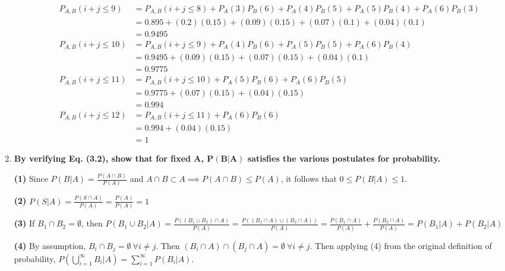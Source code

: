 \documentclass[10pt, oneside]{article}   	%
\theoremstyle{definition}
\begin{document}
\begin{enumerate}[label=3.\arabic*]
\begin{enumerate}
\begin{align*}
	P_{A,B} (i + j \leq 9) &= P_{A,B} (i + j \leq 8) + P_A (3) P_B (6) + P_A (4) P_B (5) + P_A (5) P_B (4) + P_A (6) P_B (3) \\
	&= 0.895 + (0.2)(0.15) + (0.09)(0.15) + (0.07)(0.1) + (0.04)(0.1) \\
	&= \boxed{0.9495} \\
	P_{A,B} (i + j \leq 10) &= P_{A,B} (i + j \leq 9) + P_A (4) P_B (6) + P_A (5) P_B (5) + P_A (6) P_B (4) \\
	&= 0.9495 + (0.09)(0.15) + (0.07)(0.15) + (0.04)(0.1) \\
	&= \boxed{0.9775} \\
	P_{A,B} (i + j \leq 11) &= P_{A,B} (i + j \leq 10) + P_A (5) P_B (6) + P_A (6) P_B (5) \\
	&= 0.9775 + (0.07)(0.15) + (0.04)(0.15) \\
	&= \boxed{0.994} \\
	P_{A,B} (i + j \leq 12) &= P_{A,B} (i + j \leq 11) + P_A (6) P_B (6) \\
	&= 0.994 + (0.04)(0.15) \\
	&= \boxed{1}
	\end{align*}
	
	\end{enumerate}

\newpage
\item  \begin{tcolorbox}[
  colback=Cerulean!5!white,
  colframe=Cerulean!75!black]
\textbf{By verifying Eq. (3.2), show that for fixed $\bm{A}$, $\bm{P(B | A)}$ satisfies the various postulates for probability.}
\end{tcolorbox}

\textbf{(1)} Since $P(B | A) = \frac{P(A \cap B)}{P(A)}$ and $A \cap B \subset A \implies P(A \cap B) \leq P(A)$, it follows that $0 \leq P(B | A) \leq 1$.

\textbf{(2)} $P(S | A) = \frac{P(S \cap A)}{P(A)} = \frac{P(A)}{P(A)} = 1$

\textbf{(3)} If $B_1 \cap B_2 = \emptyset$, then $P(B_1 \cup B_2 | A) = \frac{P( (B_1 \cup B_2 ) \cap A)}{P(A)} = \frac{P((B_1 \cap A) \cup (B_2 \cap A))}{P(A)} = \frac{P(B_1 \cap A)}{P(A)} + \frac{P(B_2 \cap A)}{P(A)} = P(B_1 | A) + P(B_2 | A)$

\textbf{(4)} By assumption, $B_i \cap B_j = \emptyset \ \forall i \neq j$. Then $(B_i \cap A) \cap (B_j \cap A) = \emptyset \ \forall i \neq j$. Then applying (4) from the original definition of probability, $P(\bigcup^\infty_{i = 1} B_i | A) = \sum^\infty_{i = 1} P(B_i | A)$.


\end{enumerate}
\end{document}
